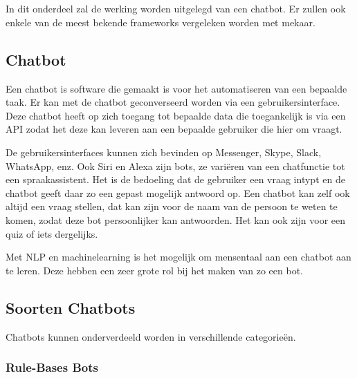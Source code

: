 \chapter{}
\label{ch:stand-van-zaken}



In dit onderdeel zal de werking worden uitgelegd van een chatbot. Er zullen ook enkele van de meest bekende frameworks vergeleken worden met mekaar.

\section{Chatbot}
\label{sec:Chatbot}

Een chatbot is software die gemaakt is voor het automatiseren van een bepaalde taak. Er kan met de chatbot geconverseerd worden via een gebruikersinterface. Deze chatbot heeft op zich toegang tot bepaalde data die toegankelijk is via een API zodat het deze kan leveren aan een bepaalde gebruiker die hier om vraagt.

De gebruikersinterfaces kunnen zich bevinden op Messenger, Skype, Slack, WhatsApp, enz. Ook Siri en Alexa zijn bots, ze variëren van een chatfunctie tot een spraakassistent. Het is de bedoeling dat de gebruiker een vraag intypt en de chatbot geeft daar zo een gepast mogelijk antwoord op. Een chatbot kan zelf ook altijd een vraag stellen, dat kan zijn voor de naam van de persoon te weten te komen, zodat deze bot persoonlijker kan antwoorden. Het kan ook zijn voor een quiz of iets dergelijks.

Met NLP en machinelearning is het mogelijk om mensentaal aan een chatbot aan te leren. Deze hebben een zeer grote rol bij het maken van zo een bot. ~\autocite{assaf2017}

\section{Soorten Chatbots}
\label{sec:Soorten Chatbots}

Chatbots kunnen onderverdeeld worden in verschillende categorieën.

\subsection{Rule-Bases Bots}
\label{Rule-Bases Bots}

